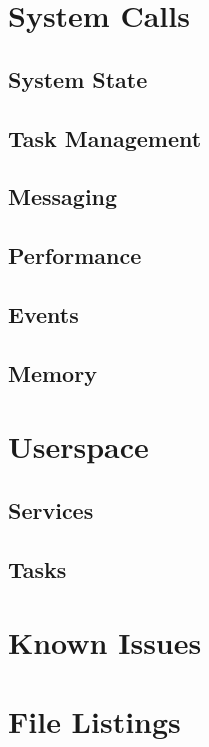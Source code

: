 \documentclass[twoside,a4paper]{refart}
\begin{document}
\section{System Calls}
\subsection{System State}
\subsection{Task Management}
\subsection{Messaging}
\subsection{Performance}
\subsection{Events}
\subsection{Memory}

\section{Userspace}
\subsection{Services}
\subsection{Tasks}

\section{Known Issues}
\section{File Listings}

\printindex
\end{document}

